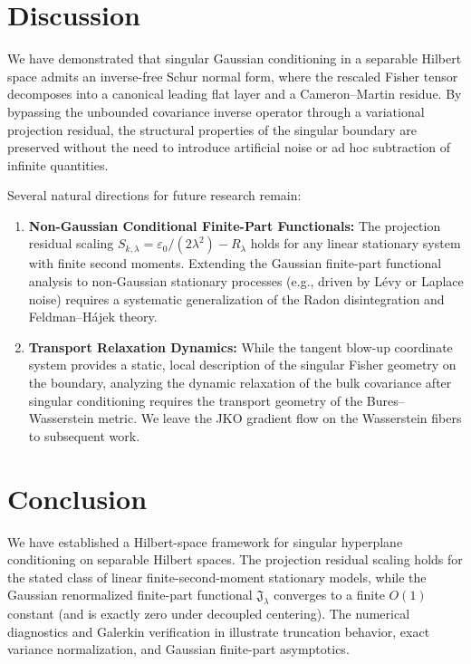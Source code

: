 \documentclass[11pt]{amsart}
\theoremstyle{plain}
\theoremstyle{definition}
\theoremstyle{remark}
\begin{document}
\section{Discussion}
\label{sec:discussion}

We have demonstrated that singular Gaussian conditioning in a separable Hilbert space admits an inverse-free Schur normal form, where the rescaled Fisher tensor decomposes into a canonical leading flat layer and a Cameron--Martin residue. By bypassing the unbounded covariance inverse operator through a variational projection residual, the structural properties of the singular boundary are preserved without the need to introduce artificial noise or ad hoc subtraction of infinite quantities.

Several natural directions for future research remain:
\begin{enumerate}
  \item[(i)] \textbf{Non-Gaussian Conditional Finite-Part Functionals:} The projection residual scaling $S_{k,\lambda} = \varepsilon_0/(2\lambda^2) - R_\lambda$ holds for any linear stationary system with finite second moments. Extending the Gaussian finite-part functional analysis to non-Gaussian stationary processes (e.g., driven by L\'{e}vy or Laplace noise) requires a systematic generalization of the Radon disintegration and Feldman--H\'{a}jek theory.
  \item[(ii)] \textbf{Transport Relaxation Dynamics:} While the tangent blow-up coordinate system provides a static, local description of the singular Fisher geometry on the boundary, analyzing the dynamic relaxation of the bulk covariance after singular conditioning requires the transport geometry of the Bures--Wasserstein metric. We leave the JKO gradient flow \cite{jordan1998variational} on the Wasserstein fibers to subsequent work.
\end{enumerate}

\section{Conclusion}
\label{sec:conclusion}

We have established a Hilbert-space framework for singular hyperplane conditioning on separable Hilbert spaces. The projection residual scaling holds for the stated class of linear finite-second-moment stationary models, while the Gaussian renormalized finite-part functional $\mathfrak{J}_\lambda$ converges to a finite $O(1)$ constant (and is exactly zero under decoupled centering). The numerical diagnostics and Galerkin verification in  illustrate truncation behavior, exact variance normalization, and Gaussian finite-part asymptotics.
\end{document}
